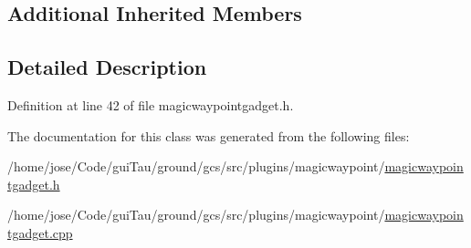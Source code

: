 \subsection*{Additional Inherited Members}


\subsection{Detailed Description}


Definition at line 42 of file magicwaypointgadget.\-h.



The documentation for this class was generated from the following files\-:\begin{DoxyCompactItemize}
\item 
/home/jose/\-Code/gui\-Tau/ground/gcs/src/plugins/magicwaypoint/\hyperlink{magicwaypointgadget_8h}{magicwaypointgadget.\-h}\item 
/home/jose/\-Code/gui\-Tau/ground/gcs/src/plugins/magicwaypoint/\hyperlink{magicwaypointgadget_8cpp}{magicwaypointgadget.\-cpp}\end{DoxyCompactItemize}
